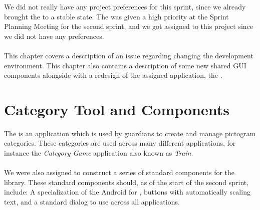\FloatBarrier

We did not really have any project preferences for this sprint, since we already brought the \launcher to a stable state. The \giraf \ct was given a high priority at the Sprint Planning Meeting for the second sprint, and we got assigned to this project since we did not have any preferences. 
\\\\
This chapter covers a description of an issue regarding changing the development environment. This chapter also contains a description of some new shared GUI components alongside with a redesign of the assigned application, the \ct. 

\section{Category Tool and Components}
\label{sec:category_tool_and_components}

The \giraf \ct is an application which is used by guardians to create and manage pictogram categories. These categories are used across many different applications, for instance the \emph{Category Game} application also known as \emph{Train}.
\\\\
We were also assigned to construct a series of standard components for the \gc library. These standard components should, as of the start of the second sprint, include: A specialization of the Android  for \giraf, buttons with automatically scaling text, and a standard dialog to use across all applications.





